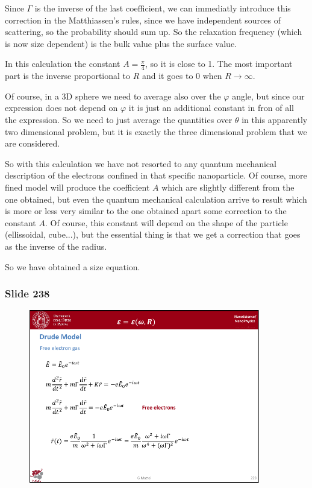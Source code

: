 \documentclass[../main/main.tex]{subfiles}
\begin{document}
Since \( \Gamma  \) is the inverse of the last coefficient, we can immediatly introduce this correction in the Matthiassen's rules, since we have independent sources of scattering, so the probability should sum up. So the relaxation frequency (which is now size dependent) is the bulk value plus the surface value.

In this calculation the constant \( A= \frac{\pi }{4} \), so it is close to 1.
The most important part is the inverse proportional to \( R \) and it goes to 0 when \( R \rightarrow  \infty  \).

Of course, in a 3D sphere we need to average also over the \( \varphi  \) angle, but since our expression does not depend on \( \varphi  \) it is just an additional constant in fron of all the expression. So we need to just average the quantities over \( \theta  \) in this apparently two dimensional problem, but it is exactly the three dimensional problem that we are considered.

So with this calculation we have not resorted to any quantum mechanical description of the electrons confined in that specific nanoparticle.
Of course, more fined model will produce the coefficient \( A \) which are slightly different from the one obtained, but even the quantum mechanical calculation arrive to result which is more or less very similar to the one obtained apart some correction to the constant \( A \).
Of course, this constant will depend on the shape of the particle (ellissoidal, cube...), but the essential thing is that we get a correction that goes as the inverse of the radius.

So we have obtained a size equation.





\newpage

\subsubsection{Slide 238}

\begin{figure}[h!]
\centering
\includegraphics[page=11,width=0.9\textwidth]{../lessons/pdf_file/15_lesson.pdf}
\end{figure}
\end{document}
